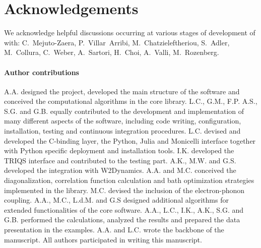 \documentclass[edipack_sp.tex]{subfiles}
\begin{document}


\section*{Acknowledgements}
We acknowledge helpful discussions occurring at various stages of development of \NAME with: C.~Mejuto-Zaera, P.~Villar~Arribi, M.~Chatzieleftheriou, S.~Adler, M.~Collura, C.~Weber, A.~Sartori, H.~Choi, A.~Valli, M.~Rozenberg.    

\paragraph{Author contributions}
A.A. designed the project, developed the main structure of the software and conceived the computational algorithms in the core library. 
L.C., G.M., F.P. A.S., S.G. and G.B.  equally contributed to the development and implementation of many different aspects of the  software, including code writing, configuration, installation, testing and continuous integration procedures. 
L.C. devised and developed the C-binding layer, the Python, Julia and Monicelli interface together with Python specific deployment and installation tools. 
I.K. developed the TRIQS interface and contributed to the testing part. 
A.K., M.W. and G.S. developed the integration with W2Dynamics.  
A.A. and M.C. conceived the diagonalization, correlation function  calculation and bath optimization strategies implemented in the library. M.C. devised the inclusion of the electron-phonon coupling. 
A.A., M.C., L.d.M. and G.S designed additional algorithms for extended functionalities of the core software.   
A.A., L.C., I.K., A.K., S.G. and G.B. performed the calculations, analyzed the results and prepared the data presentation in the examples.
A.A. and L.C. wrote the backbone of the manuscript.
All authors participated in writing this manuscript. 

\end{document}
